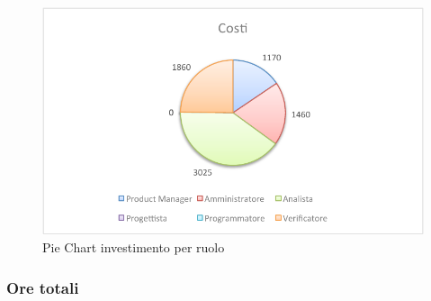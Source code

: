 				\begin{figure}[H]\centering
					\includegraphics[width=\textwidth]{PianoDiProgetto/Pics/ChartTotCostiInvest.pdf}
					\caption{Pie Chart investimento per ruolo}
				\end{figure}
		\subsubsection{Ore totali}
